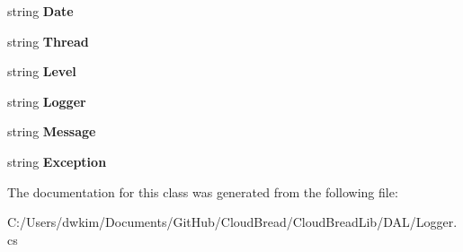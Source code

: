 \begin{DoxyCompactItemize}
\item 
string {\bfseries Date}\hypertarget{class_cloud_bread_lib_1_1_d_a_l_1_1_logger_1_1_c_b_log_message_a3e54d4484987301a22735526ef9c5976}{}\label{class_cloud_bread_lib_1_1_d_a_l_1_1_logger_1_1_c_b_log_message_a3e54d4484987301a22735526ef9c5976}

\item 
string {\bfseries Thread}\hypertarget{class_cloud_bread_lib_1_1_d_a_l_1_1_logger_1_1_c_b_log_message_aa9adee6a804c6d34a37c6ef47fbfc85e}{}\label{class_cloud_bread_lib_1_1_d_a_l_1_1_logger_1_1_c_b_log_message_aa9adee6a804c6d34a37c6ef47fbfc85e}

\item 
string {\bfseries Level}\hypertarget{class_cloud_bread_lib_1_1_d_a_l_1_1_logger_1_1_c_b_log_message_a1d48ff9647c2c2ae0663cc518064fa5f}{}\label{class_cloud_bread_lib_1_1_d_a_l_1_1_logger_1_1_c_b_log_message_a1d48ff9647c2c2ae0663cc518064fa5f}

\item 
string {\bfseries Logger}\hypertarget{class_cloud_bread_lib_1_1_d_a_l_1_1_logger_1_1_c_b_log_message_a1985d8f6e35a4092ee08241c932192d7}{}\label{class_cloud_bread_lib_1_1_d_a_l_1_1_logger_1_1_c_b_log_message_a1985d8f6e35a4092ee08241c932192d7}

\item 
string {\bfseries Message}\hypertarget{class_cloud_bread_lib_1_1_d_a_l_1_1_logger_1_1_c_b_log_message_a731b50713ec4b57fdaf89572ee8ac35b}{}\label{class_cloud_bread_lib_1_1_d_a_l_1_1_logger_1_1_c_b_log_message_a731b50713ec4b57fdaf89572ee8ac35b}

\item 
string {\bfseries Exception}\hypertarget{class_cloud_bread_lib_1_1_d_a_l_1_1_logger_1_1_c_b_log_message_aaa8a8162d82c557946d48b03aa40a959}{}\label{class_cloud_bread_lib_1_1_d_a_l_1_1_logger_1_1_c_b_log_message_aaa8a8162d82c557946d48b03aa40a959}

\end{DoxyCompactItemize}


The documentation for this class was generated from the following file\+:\begin{DoxyCompactItemize}
\item 
C\+:/\+Users/dwkim/\+Documents/\+Git\+Hub/\+Cloud\+Bread/\+Cloud\+Bread\+Lib/\+D\+A\+L/Logger.\+cs\end{DoxyCompactItemize}
